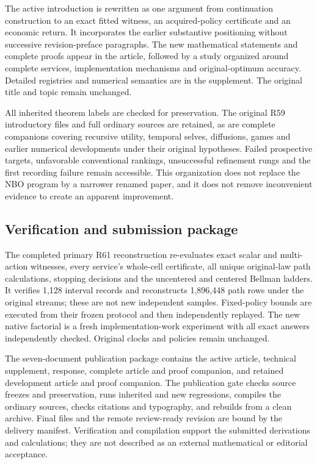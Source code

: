 The active introduction is rewritten as one argument from continuation
construction to an exact fitted witness, an acquired-policy certificate
and an economic return. It incorporates the earlier substantive
positioning without successive revision-preface paragraphs. The new
mathematical statements and complete proofs appear in the article,
followed by a study organized around complete services, implementation
mechanisms and original-optimum accuracy. Detailed registries and
numerical semantics are in the supplement. The original title and topic
remain unchanged.

All inherited theorem labels are checked for preservation. The original
R59 introductory files and full ordinary sources are retained, as are
complete companions covering recursive utility, temporal selves,
diffusions, games and earlier numerical developments under their
original hypotheses. Failed prospective targets, unfavorable
conventional rankings, unsuccessful refinement rungs and the first
recording failure remain accessible. This organization does not replace
the NBO program by a narrower renamed paper, and it does not remove
inconvenient evidence to create an apparent improvement.

\hypertarget{verification-and-submission-package}{%
\subsection{Verification and submission
package}\label{verification-and-submission-package}}

The completed primary R61 reconstruction re-evaluates exact scalar and
multi-action witnesses, every service's whole-cell certificate, all
unique original-law path calculations, stopping decisions and the
uncentered and centered Bellman ladders. It verifies 1,128 interval
records and reconstructs 1,896,448 path rows under the original streams;
these are not new independent samples. Fixed-policy bounds are executed
from their frozen protocol and then independently replayed. The new
native factorial is a fresh implementation-work experiment with all
exact answers independently checked. Original clocks and policies remain
unchanged.

The seven-document publication package contains the active article,
technical supplement, response, complete article and proof companion,
and retained development article and proof companion. The publication
gate checks source freezes and preservation, runs inherited and new
regressions, compiles the ordinary sources, checks citations and
typography, and rebuilds from a clean archive. Final files and the
remote review-ready revision are bound by the delivery manifest.
Verification and compilation support the submitted derivations and
calculations; they are not described as an external mathematical or
editorial acceptance.
